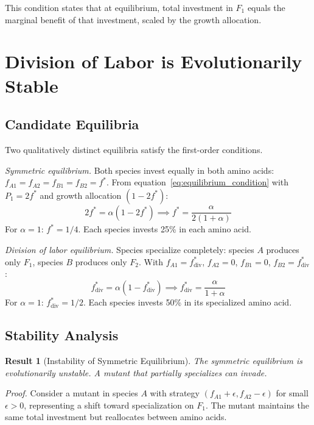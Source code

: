 \documentclass[11pt]{article}
\newtheorem{theorem}{Result}
\begin{document}
This condition states that at equilibrium, total investment in $F_1$ equals the marginal benefit of that investment, scaled by the growth allocation.

\section{Division of Labor is Evolutionarily Stable}

\subsection{Candidate Equilibria}

Two qualitatively distinct equilibria satisfy the first-order conditions.

\textit{Symmetric equilibrium.} Both species invest equally in both amino acids: $f_{A1} = f_{A2} = f_{B1} = f_{B2} = f^*$. From equation~\ref{eq:equilibrium_condition} with $P_1 = 2f^*$ and growth allocation $(1 - 2f^*)$:
\begin{equation}
2f^* = \alpha(1 - 2f^*) \implies f^* = \frac{\alpha}{2(1 + \alpha)}
\end{equation}
For $\alpha = 1$: $f^* = 1/4$. Each species invests 25\% in each amino acid.

\textit{Division of labor equilibrium.} Species specialize completely: species $A$ produces only $F_1$, species $B$ produces only $F_2$. With $f_{A1} = f^*_{\text{div}}$, $f_{A2} = 0$, $f_{B1} = 0$, $f_{B2} = f^*_{\text{div}}$:
\begin{equation}
f^*_{\text{div}} = \alpha(1 - f^*_{\text{div}}) \implies f^*_{\text{div}} = \frac{\alpha}{1 + \alpha}
\end{equation}
For $\alpha = 1$: $f^*_{\text{div}} = 1/2$. Each species invests 50\% in its specialized amino acid.

\subsection{Stability Analysis}

\begin{theorem}[Instability of Symmetric Equilibrium]
The symmetric equilibrium is evolutionarily unstable. A mutant that partially specializes can invade.
\end{theorem}

\textit{Proof.} Consider a mutant in species $A$ with strategy $(f_{A1} + \epsilon, f_{A2} - \epsilon)$ for small $\epsilon > 0$, representing a shift toward specialization on $F_1$. The mutant maintains the same total investment but reallocates between amino acids.
\end{document}
